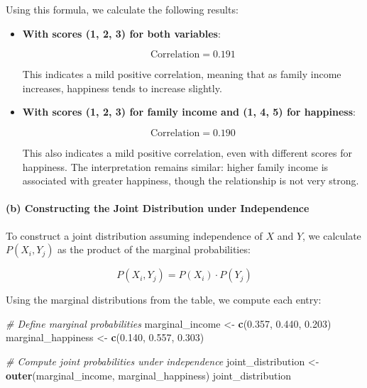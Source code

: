 \documentclass[
]{article}
\newenvironment{Shaded}{\begin{snugshade}}{\end{snugshade}}
\newcommand{\CommentTok}[1]{\textcolor[rgb]{0.56,0.35,0.01}{\textit{#1}}}
\newcommand{\FloatTok}[1]{\textcolor[rgb]{0.00,0.00,0.81}{#1}}
\newcommand{\FunctionTok}[1]{\textcolor[rgb]{0.13,0.29,0.53}{\textbf{#1}}}
\newcommand{\NormalTok}[1]{#1}
\newcommand{\OtherTok}[1]{\textcolor[rgb]{0.56,0.35,0.01}{#1}}
\begin{document}
Using this formula, we calculate the following results:

\begin{itemize}
\item
  \textbf{With scores (1, 2, 3) for both variables}:

  \[
  \text{Correlation} = 0.191
  \]

  This indicates a mild positive correlation, meaning that as family
  income increases, happiness tends to increase slightly.
\item
  \textbf{With scores (1, 2, 3) for family income and (1, 4, 5) for
  happiness}:

  \[
  \text{Correlation} = 0.190
  \]

  This also indicates a mild positive correlation, even with different
  scores for happiness. The interpretation remains similar: higher
  family income is associated with greater happiness, though the
  relationship is not very strong.
\end{itemize}

\hypertarget{b-constructing-the-joint-distribution-under-independence}{%
\paragraph{(b) Constructing the Joint Distribution under
Independence}\label{b-constructing-the-joint-distribution-under-independence}}

To construct a joint distribution assuming independence of \(X\) and
\(Y\), we calculate \(P(X_i, Y_j)\) as the product of the marginal
probabilities:

\[
P(X_i, Y_j) = P(X_i) \cdot P(Y_j)
\]

Using the marginal distributions from the table, we compute each entry:

\begin{Shaded}
\begin{Highlighting}[]
\CommentTok{\# Define marginal probabilities}
\NormalTok{marginal\_income }\OtherTok{\textless{}{-}} \FunctionTok{c}\NormalTok{(}\FloatTok{0.357}\NormalTok{, }\FloatTok{0.440}\NormalTok{, }\FloatTok{0.203}\NormalTok{)}
\NormalTok{marginal\_happiness }\OtherTok{\textless{}{-}} \FunctionTok{c}\NormalTok{(}\FloatTok{0.140}\NormalTok{, }\FloatTok{0.557}\NormalTok{, }\FloatTok{0.303}\NormalTok{)}

\CommentTok{\# Compute joint probabilities under independence}
\NormalTok{joint\_distribution }\OtherTok{\textless{}{-}} \FunctionTok{outer}\NormalTok{(marginal\_income, marginal\_happiness)}
\NormalTok{joint\_distribution}
\end{Highlighting}
\end{Shaded}
\end{document}
